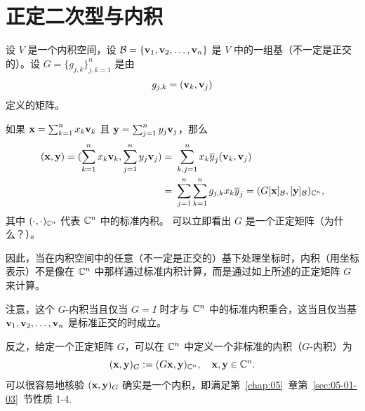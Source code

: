 \section{正定二次型与内积}\label{sec:07-05}

设 $V$ 是一个内积空间，设 $\mathcal{B} = \{\mathbf{v}_1, \mathbf{v}_2, \dots, \mathbf{v}_n\}$ 是 $V$ 中的一组基（不一定是正交的）。设 $G = \{g_{j,k}\}^{n}_{j,k=1}$ 是由 $$g_{j,k} = (\mathbf{v}_k, \mathbf{v}_j)$$
定义的矩阵。

如果 $\mathbf{x} = \sum_{k=1}^n x_k \mathbf{v}_k$ 且 $\mathbf{y} = \sum_{j=1}^n y_j \mathbf{v}_j$，那么
\begin{equation} \notag
\begin{split}
(\xx, \yy) = (\sum_{k=1}^n x_k \vv_k, \sum_{j=1}^n y_j \vv_j) =&\ \sum_{k,j=1}^n x_k \overline{y}_j (\vv_k, \vv_j)\\ =&\ \sum_{j=1}^n \sum_{k=1}^n g_{j,k} x_k \overline{y}_j = (G [\xx]_\B, [\yy]_\B)_{\CC^n},
\end{split}\end{equation}
其中 $( \cdot, \cdot )_{\mathbb{C}^n}$ 代表 $\mathbb{C}^n$ 中的标准内积。
可以立即看出 $G$ 是一个正定矩阵（为什么？）。

因此，当在内积空间中的任意（不一定是正交的）基下处理坐标时，内积（用坐标表示）不是像在 $\mathbb{C}^n$ 中那样通过标准内积计算，而是通过如上所述的正定矩阵 $G$ 来计算。


注意，这个 $G$-内积当且仅当 $G=I$ 时才与 $\mathbb{C}^n$ 中的标准内积重合，这当且仅当基 $\mathbf{v}_1, \mathbf{v}_2, \dots, \mathbf{v}_n$ 是标准正交的时成立。

反之，给定一个正定矩阵 $G$，可以在 $\mathbb{C}^n$ 中定义一个非标准的内积（$G$-内积）为
$$(\mathbf{x}, \mathbf{y})_G := (G\mathbf{x}, \mathbf{y})_{\mathbb{C}^n},\quad \mathbf{x}, \mathbf{y} \in \mathbb{C}^n.$$
可以很容易地核验 $(\mathbf{x}, \mathbf{y})_G$ 确实是一个内积，即满足第~\ref{chap:05}~章第~\ref{sec:05-01-03}~节性质 1-4.




